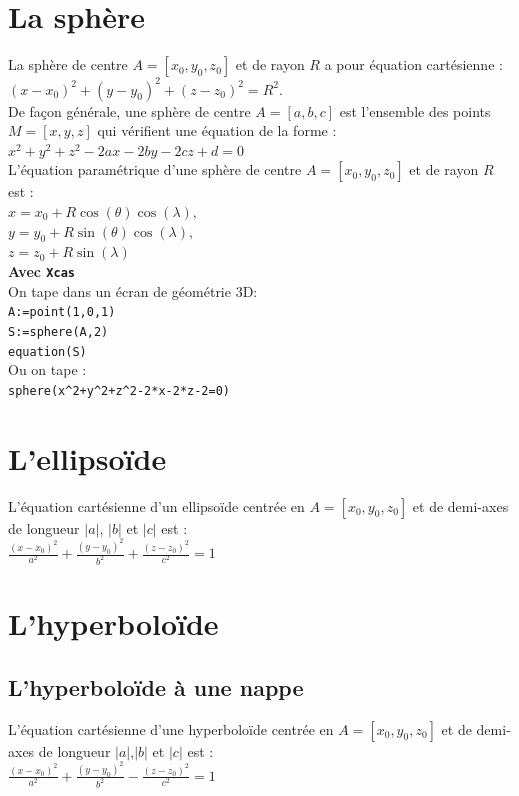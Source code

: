 \documentclass[a4paper,11pt]{book}
\begin{document}
\section{La sph\`ere}
La sph\`ere de centre $A=[x_0,y_0,z_0]$ et de rayon $R$ a pour \'equation 
cart\'esienne :\\
$(x-x_0)^2+(y-y_0)^2+(z-z_0)^2=R^2$.\\
De fa\c{c}on g\'en\'erale, une sph\`ere de centre $A=[a,b,c]$
est l'ensemble des points $M=[x,y,z]$
qui v\'erifient une \'equation de la forme :\\
$x^2+y^2+z^2-2ax-2by-2cz+d=0$\\
L'\'equation param\'etrique d'une sph\`ere de centre $A=[x_0,y_0,z_0]$ et de 
rayon $R$ est :\\
$x=x_0+R\cos(\theta)\cos(\lambda),$\\
$ y=y_0+R\sin(\theta)\cos(\lambda),$\\
$z=z_0+R\sin(\lambda)$\\
{\bf Avec {\tt Xcas}}\\
On tape dans un \'ecran de g\'eom\'etrie 3D:\\
{\tt A:=point(1,0,1)}\\
{\tt S:=sphere(A,2)}\\
{\tt equation(S)}\\
Ou on tape :\\
{\tt sphere(x\verb|^|2+y\verb|^|2+z\verb|^|2-2*x-2*z-2=0)}\\
\section{L'ellipso\"{i}de}
\noindent L'\'equation cart\'esienne d'un ellipso\"{i}de centr\'ee en 
$A=[x_0,y_0,z_0]$ 
et de demi-axes de longueur  $|a|$, $|b|$ et $|c|$ est :\\
$\displaystyle \frac{(x-x_0)^2}{a^2}+\frac{(y-y_0)^2}{b^2}+\frac{(z-z_0)^2}{c^2}=1$ \\

\section{L'hyperbolo\"{i}de}
\subsection{L'hyperbolo\"{i}de \`a une nappe}
\noindent L'\'equation cart\'esienne d'une hyperbolo\"{i}de centr\'ee en 
$A=[x_0,y_0,z_0]$
 et de demi-axes de longueur  $|a|$,$|b|$ et $|c|$ est :\\
 $\frac{(x-x_0)^2}{a^2}+\frac{(y-y_0)^2}{b^2}-\frac{(z-z_0)^2}{c^2}=1$ 
\end{document}
